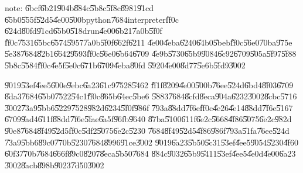 note: \U{6bcf}\U{6b21}\U{904b}\U{884c}\U{5b8c}\U{5f8c}\U{8981}\U{91cd}%
\U{65b0}\U{555f}\U{52d5}\U{4e00}\U{500b}python\U{7684}interpreter\U{ff0c}%
\U{624d}\U{80fd}\U{91cd}\U{65b0}\U{518d}run\U{4e00}\U{6b21}\U{7a0b}\U{5f0f}%
\U{ff0c}\U{7531}\U{65bc}\U{6574}\U{5957}\U{7a0b}\U{5f0f}\U{662f}\U{6211}%
\U{4e00}\U{4eba}\U{6240}\U{64b0}\U{5beb}\U{ff0c}\U{56e0}\U{70ba}\U{975e}%
\U{5e38}\U{7684}\U{82b1}\U{6642}\U{9593}\U{ff0c}\U{56e0}\U{6b64}\U{6709}%
\U{4e9b}\U{5730}\U{65b9}\U{9084}\U{6c92}\U{6709}\U{505a}\U{5f97}\U{5f88}%
\U{5b8c}\U{5584}\U{ff0c}\U{4e5f}\U{5e0c}\U{671b}\U{6709}\U{4eba}\U{80fd}%
\U{5920}\U{4e00}\U{8d77}\U{5e6b}\U{5fd9}\U{3002}

\bigskip

\U{9019}\U{53ef}\U{4ee5}\U{600e}\U{9ebc}\U{6a23}\U{61c9}\U{7528}\U{5462}%
\U{ff1f}\U{8209}\U{4e00}\U{500b}\U{76ee}\U{524d}\U{6bd4}\U{8f03}\U{6709}%
\U{8da3}\U{7684}\U{65b0}\U{7522}\U{54c1}\U{ff0c}\U{865b}\U{64ec}\U{5be6}%
\U{5883}\U{7684}\U{8cfd}\U{8eca}\U{904a}\U{6232}\U{3002}\U{8cbc}\U{5716}%
\U{3002}\U{73a9}\U{5bb6}\U{5229}\U{7528}\U{982d}\U{6234}\U{5f0f}\U{986f}%
\U{793a}\U{88dd}\U{7f6e}\U{ff0c}\U{4e26}\U{4e14}\U{88dd}\U{7f6e}\U{5167}%
\U{6709}\U{9ad4}\U{611f}\U{88dd}\U{7f6e}\U{5fae}\U{6a5f}\U{96fb}\U{9640}%
\U{87ba}\U{5100}\U{611f}\U{6e2c}\U{5668}\U{4f86}\U{5075}\U{6e2c}\U{982d}%
\U{90e8}\U{7684}\U{8f49}\U{52d5}\U{ff0c}\U{5df2}\U{5075}\U{6e2c}\U{5230}%
\U{7684}\U{8f49}\U{52d5}\U{4f86}\U{986f}\U{793a}\U{51fa}\U{76ee}\U{524d}%
\U{73a9}\U{5bb6}\U{89c0}\U{770b}\U{5230}\U{7684}\U{8996}\U{91ce}\U{3002}%
\U{9019}\U{6a23}\U{5b50}\U{5c31}\U{53ef}\U{4ee5}\U{9054}\U{5230}\U{4f60}%
\U{60f3}\U{770b}\U{7684}\U{666f}\U{89c0}\U{8207}\U{8eca}\U{5b50}\U{7684}%
\U{884c}\U{9032}\U{65b9}\U{5411}\U{53ef}\U{4ee5}\U{4e0d}\U{4e00}\U{6a23}%
\U{3002}\U{8acb}\U{898b}\U{9023}\U{7d50}\U{3002}

\clearpage%

